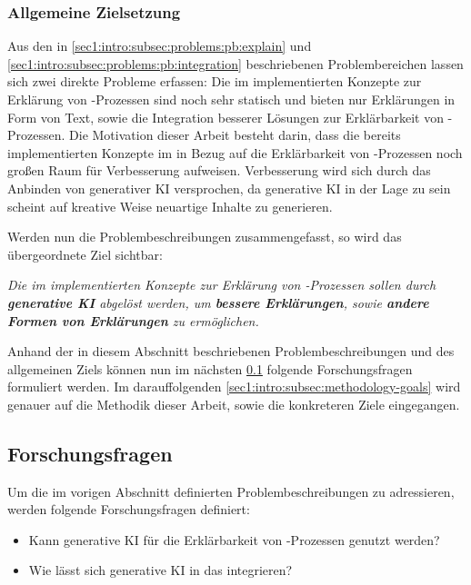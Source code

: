 \subsubsection{Allgemeine Zielsetzung}
\label{sec1:intro:subsec:objective}
Aus den in \cref{sec1:intro:subsec:problems:pb:explain} und \cref{sec1:intro:subsec:problems:pb:integration} beschriebenen Problembereichen lassen sich zwei direkte Probleme erfassen:
Die im \gmaf{} implementierten Konzepte zur Erklärung von \mmir{}-Prozessen sind noch sehr statisch und bieten nur Erklärungen in Form von Text, sowie die Integration besserer Lösungen zur Erklärbarkeit von \mmir{}-Prozessen.
Die Motivation dieser Arbeit besteht darin, dass die bereits implementierten Konzepte im \gmaf{} in Bezug auf die Erklärbarkeit von \mmir{}-Prozessen noch großen Raum für Verbesserung aufweisen.
Verbesserung wird sich durch das Anbinden von generativer KI versprochen, da generative KI in der Lage zu sein scheint auf kreative Weise neuartige Inhalte zu generieren.

Werden nun die Problembeschreibungen zusammengefasst, so wird das übergeordnete Ziel sichtbar:

\textit{Die im \gmaf{} implementierten Konzepte zur Erklärung von \mmir{}-Prozessen sollen durch \textbf{generative KI} abgelöst werden, um \textbf{bessere Erklärungen}, sowie \textbf{andere Formen von Erklärungen} zu ermöglichen.}

\clearpage
Anhand der in diesem Abschnitt beschriebenen Problembeschreibungen und des allgemeinen Ziels können nun im nächsten \cref{sec1:intro:subsec:research-questions} folgende Forschungsfragen formuliert werden. Im darauffolgenden \cref{sec1:intro:subsec:methodology-goals} wird genauer auf die Methodik dieser Arbeit, sowie die konkreteren Ziele eingegangen.

\subsection{Forschungsfragen}
\label{sec1:intro:subsec:research-questions}
Um die im vorigen Abschnitt definierten Problembeschreibungen zu adressieren, werden folgende Forschungsfragen definiert:
\begin{itemize}
    \item \researchquestion{} Kann generative KI für die Erklärbarkeit von \mmir{}-Prozessen genutzt werden?
    \item \researchquestion{} Wie lässt sich generative KI in das \gmaf{} integrieren?
\end{itemize}

